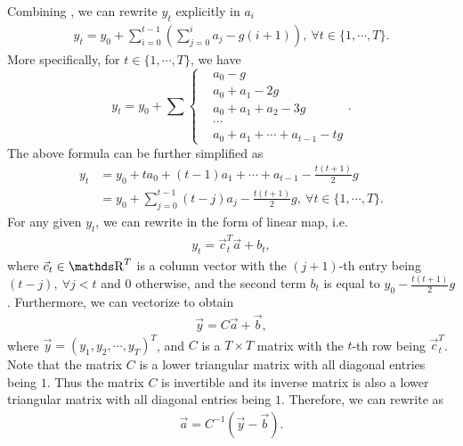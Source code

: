 \documentclass[letterpaper,10pt]{article}
\begin{document}
Combining , we can rewrite $y_t$ explicitly in $a_i$
\begin{align}
    \label{eq:yt-rewrite}
    y_t = y_0 + \sum_{i=0}^{t-1} \left(\sum_{j=0}^{i} a_j - g (i+1)\right),~\forall t\in \{1,\cdots,T\}.
\end{align}
More specifically, for $t\in \{1,\cdots,T\}$, we have
\begin{equation}
    y_t=y_0+\sum
    \left\{
        \begin{array}{lllll}
            & a_0-g\\
            & a_0+a_1-2g\\
            & a_0+a_1+a_2-3g\\
            & \cdots\\
            & a_0+a_1+\cdots+a_{t-1}-t g
        \end{array}
    \right..
\end{equation}
The above formula can be further simplified as
\begin{align}
    y_t &= y_0 + t a_0 + (t-1)a_1 + \cdots + a_{t-1} - \frac{t(t+1)}{2} g\\
    \label{eq:yt-rewrite2}
    &= y_0 + \sum_{j=0}^{t-1} (t-j) a_j - \frac{t(t+1)}{2} g,~\forall t\in \{1,\cdots,T\}.
\end{align}
For any given $y_t$, we can rewrite  in the form of linear map, i.e.
\begin{align}
    \label{eq:yt-liear-combine}
    y_t = \vec c_t^T \vec a + b_t,
\end{align}
where $\vec c_t\in \Reals^T$ is a column vector with the $(j+1)$-th entry being $(t-j),~\forall j<t$ and $0$ otherwise, and the second term $b_t$ is equal to $y_0-\frac{t(t+1)}{2} g$.
Furthermore, we can vectorize  to obtain
\begin{align}
    \label{eq:yt-liear-map}
    \vec y = C \vec a + \vec b,
\end{align}
where $\vec y=(y_1,y_2,\cdots,y_T)^T$, and $C$ is a $T\times T$ matrix with the $t$-th row being $\vec c_t^T$.
Note that the matrix $C$ is a lower triangular matrix with all diagonal entries being $1$.
Thus the matrix $C$ is invertible and its inverse matrix is also a lower triangular matrix with all diagonal entries being $1$.
Therefore, we can rewrite  as
\begin{align}
    \label{eq:yt-liear-map2}
    \vec a = C^{-1} (\vec y - \vec b).
\end{align}
\end{document}
